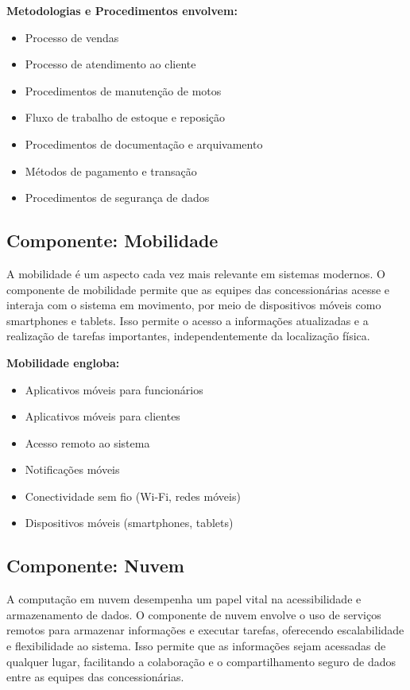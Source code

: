	\textbf{Metodologias e Procedimentos envolvem:}
	
	\begin{itemize}
		\item Processo de vendas
		\item Processo de atendimento ao cliente
		\item Procedimentos de manutenção de motos
		\item Fluxo de trabalho de estoque e reposição
		\item Procedimentos de documentação e arquivamento
		\item Métodos de pagamento e transação
		\item Procedimentos de segurança de dados
	\end{itemize}


     \subsection{Componente: Mobilidade}
     A mobilidade é um aspecto cada vez mais relevante em sistemas modernos. O componente de mobilidade permite que as equipes das concessionárias acesse e interaja com o sistema em movimento, por meio de dispositivos móveis como smartphones e tablets. Isso permite o acesso a informações atualizadas e a realização de tarefas importantes, independentemente da localização física.
     
	\textbf{Mobilidade engloba:}
	\begin{itemize}
		\item Aplicativos móveis para funcionários
		\item Aplicativos móveis para clientes
		\item Acesso remoto ao sistema
		\item Notificações móveis
		\item Conectividade sem fio (Wi-Fi, redes móveis)
		\item Dispositivos móveis (smartphones, tablets)
	\end{itemize}


     \subsection{Componente: Nuvem}
     A computação em nuvem desempenha um papel vital na acessibilidade e armazenamento de dados. O componente de nuvem envolve o uso de serviços remotos para armazenar informações e executar tarefas, oferecendo escalabilidade e flexibilidade ao sistema. Isso permite que as informações sejam acessadas de qualquer lugar, facilitando a colaboração e o compartilhamento seguro de dados entre as equipes das concessionárias.
     
